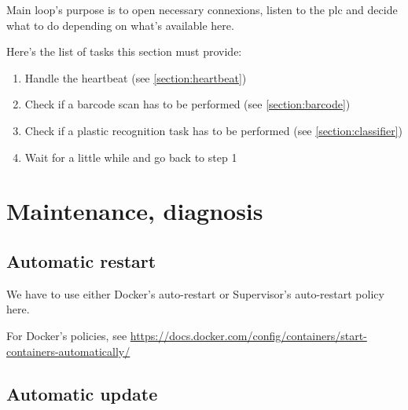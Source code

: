Main loop's purpose is to open necessary connexions, listen to the \gls{plc} and decide what to do depending on what's available here.

Here's the list of tasks this section must provide:

\begin{enumerate}
    \item Handle the \gls{heartbeat} (see \ref{section:heartbeat})
    \item Check if a barcode scan has to be performed (see \ref{section:barcode})
    \item Check if a plastic recognition task has to be performed (see \ref{section:classifier})
    \item Wait for a little while and go back to step 1
\end{enumerate}



\section{Maintenance, diagnosis}

\subsection{Automatic restart}


We have to use either Docker's auto-restart or Supervisor's auto-restart policy here.

For Docker's policies, see \url{https://docs.docker.com/config/containers/start-containers-automatically/}


\subsection{Automatic update}

